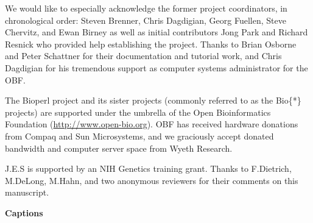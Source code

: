\documentclass[12pt]{article}
\begin{document}
% 
We would like to especially acknowledge the former project
coordinators, in chronological order: Steven Brenner, Chris Dagdigian,
Georg Fuellen, Steve Chervitz, and Ewan Birney as well as initial
contributors Jong Park and Richard Resnick who provided help
establishing the project.  Thanks to Brian Osborne and Peter Schattner
for their documentation and tutorial work, and Chris Dagdigian for his
tremendous support as computer systems administrator for the OBF.

The Bioperl project and its sister projects (commonly referred to as
the Bio\{*\} projects) are supported under the umbrella of the Open
Bioinformatics Foundation (\url{http://www.open-bio.org}).  OBF has
received hardware donations from Compaq and Sun Microsystems, and we
graciously accept donated bandwidth and computer server space from
Wyeth Research.

J.E.S is supported by an NIH Genetics training grant.  Thanks to
F.Dietrich, M.DeLong, M.Hahn, and two anonymous reviewers for their
comments on this manuscript.


 

\newpage

\begin{center}{\large \textbf{Captions}}\end{center}
\end{document}
